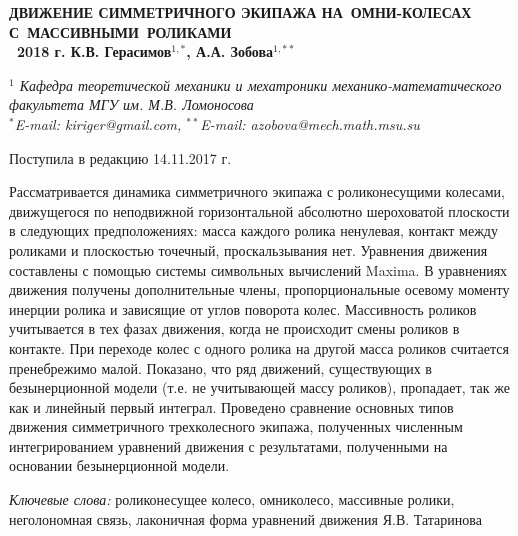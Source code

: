 \begin{center}
\large
\textbf{ ДВИЖЕНИЕ СИММЕТРИЧНОГО ЭКИПАЖА НА~ОМНИ-КОЛЕСАХ С~МАССИВНЫМИ~РОЛИКАМИ \\
\textcopyright \ 2018 г. \quad К.В. Герасимов$^{1,*}$, А.А. Зобова$^{1,**}$ }

\textit{ $^1$ Кафедра теоретической механики и мехатроники механико-математического факультета МГУ им. М.В. Ломоносова \\
$^*$E-mail: kiriger@gmail.com, $^{**}$E-mail: azobova@mech.math.msu.su }

Поступила в редакцию 14.11.2017 г.

\nocite{mecanum}
\nocite{ZobovaTatarinovAspecty2006}
\nocite{formalskii}
\nocite{zobova2008svobodnye8020851}
\nocite{ZobovaTatarinovPMM}
\nocite{Martynenko2010}
\nocite{borisov}
\nocite{Williams2002}
\nocite{Ashmore2002}
\nocite{Tobolar}
\nocite{KosenkoGerasimov}
\nocite{Tatarinov}
\nocite{Zobova2011}

\vspace{0.3cm}
\normalsize
\end{center}
\begin{adjustwidth}{1cm}{1cm}
\hspace{1cm} Рассматривается динамика симметричного экипажа с роликонесущими колесами, движущегося по  неподвижной горизонтальной абсолютно шероховатой плоскости в следующих предположениях: масса каждого ролика ненулевая, контакт между роликами и плоскостью точечный, проскальзывания нет. Уравнения движения составлены с помощью системы символьных вычислений Maxima. В уравнениях движения получены дополнительные члены, пропорциональные осевому моменту инерции ролика и зависящие от углов поворота колес. Массивность роликов учитывается в тех фазах движения, когда не происходит смены роликов в контакте. При переходе колес с одного ролика на другой масса роликов считается пренебрежимо малой. Показано, что ряд движений, существующих в безынерционной модели (т.е. не учитывающей массу роликов), пропадает, так же как и линейный первый интеграл. Проведено сравнение основных типов движения симметричного трехколесного экипажа, полученных численным интегрированием уравнений движения с результатами, полученными на основании безынерционной модели.
\end{adjustwidth} 
\textit{Ключевые слова:} роликонесущее колесо, омниколесо, массивные ролики, неголономная связь, лаконичная форма уравнений движения Я.В. Татаринова
\vspace{1.5cm}



